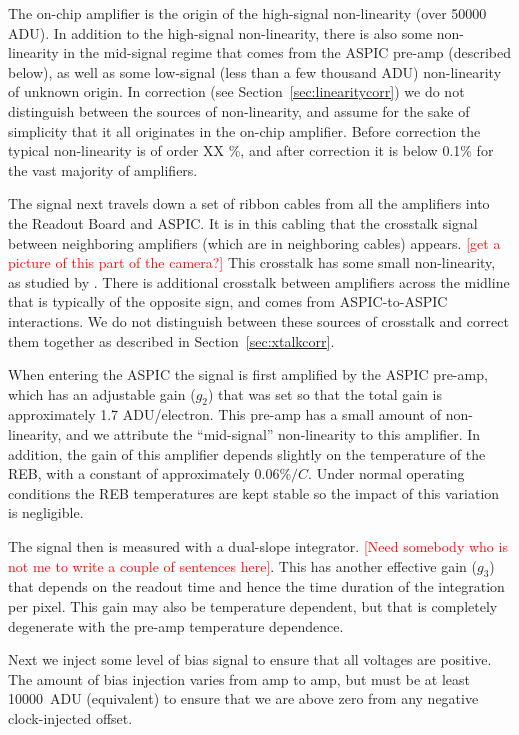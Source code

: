 \documentclass[SE,authoryear,lsstdraft,toc]{lsstdoc}
\newcommand{\todo}[1]{\textcolor{red}{#1}}
\begin{document}
The on-chip amplifier is the origin of the high-signal non-linearity (over 50000 ADU).
In addition to the high-signal non-linearity, there is also some non-linearity in the mid-signal regime that comes from the ASPIC pre-amp (described below), as well as some low-signal (less than a few thousand ADU) non-linearity of unknown origin.
In correction (see Section~\ref{sec:linearitycorr}) we do not distinguish between the sources of non-linearity, and assume for the sake of simplicity that it all originates in the on-chip amplifier.
Before correction the typical non-linearity is of order XX \%, and after correction it is below 0.1\% for the vast majority of amplifiers.

The signal next travels down a set of ribbon cables from all the amplifiers into the Readout Board and ASPIC.
It is in this cabling that the crosstalk signal between neighboring amplifiers (which are in neighboring cables) appears.
\todo{[get a picture of this part of the camera?]}
This crosstalk has some small non-linearity, as studied by \citet{2020PhDT........49S}.
There is additional crosstalk between amplifiers across the midline that is typically of the opposite sign, and comes from ASPIC-to-ASPIC interactions.
We do not distinguish between these sources of crosstalk and correct them together as described in Section~\ref{sec:xtalkcorr}.

When entering the ASPIC the signal is first amplified by the ASPIC pre-amp, which has an adjustable gain ($g_2$) that was set so that the total gain is approximately 1.7 ADU/electron.
This pre-amp has a small amount of non-linearity, and we attribute the ``mid-signal'' non-linearity to this amplifier.
In addition, the gain of this amplifier depends slightly on the temperature of the REB, with a constant of approximately $0.06\%/C$.
Under normal operating conditions the REB temperatures are kept stable so the impact of this variation is negligible.

The signal then is measured with a dual-slope integrator.
\todo{[Need somebody who is not me to write a couple of sentences here]}.
This has another effective gain ($g_3$) that depends on the readout time and hence the time duration of the integration per pixel.
This gain may also be temperature dependent, but that is completely degenerate with the pre-amp temperature dependence.

Next we inject some level of bias signal to ensure that all voltages are positive.
The amount of bias injection varies from amp to amp, but must be at least 10000~ADU (equivalent) to ensure that we are above zero from any negative clock-injected offset.
\end{document}
